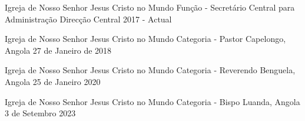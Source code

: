 \begin{cventries}
\cventry
{Igreja de Nosso Senhor Jesus Cristo no Mundo} %
{Função - Secretário Central para Administração} %
{Direcção Central} %
{2017 - Actual} %
{ %
}

\cventry
{Igreja de Nosso Senhor Jesus Cristo no Mundo} %
{Categoria - Pastor} %
{Capelongo, Angola} %
{27 de Janeiro de 2018} %
{ %
}

\cventry
{Igreja de Nosso Senhor Jesus Cristo no Mundo} %
{Categoria - Reverendo} %
{Benguela, Angola} %
{25 de Janeiro 2020} %
{ %
}

\cventry
{Igreja de Nosso Senhor Jesus Cristo no Mundo} %
{Categoria - Bispo} %
{Luanda, Angola} %
{3 de Setembro 2023} %
{ %
}


\end{cventries}
